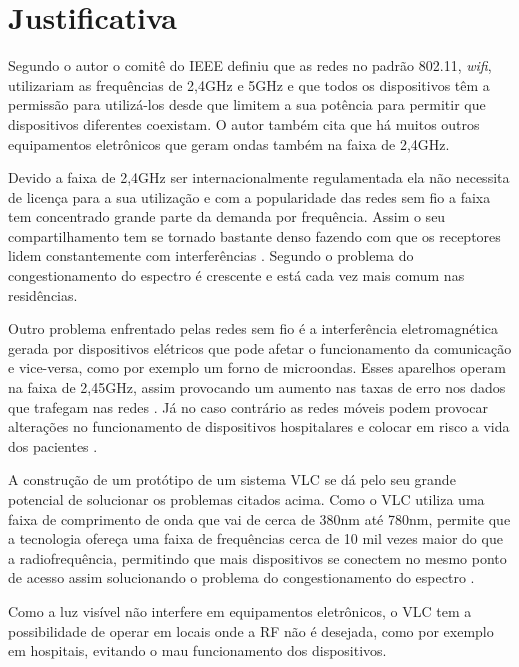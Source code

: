 \section{Justificativa}

Segundo o autor  o comitê do IEEE definiu que as redes no padrão 802.11, \textit{wifi}, utilizariam as frequências de 2,4GHz e 5GHz e que todos os dispositivos têm a permissão para utilizá-los desde que limitem a sua potência para permitir que dispositivos diferentes coexistam. O autor  também cita que há muitos outros equipamentos eletrônicos que geram ondas também na faixa de 2,4GHz. 

Devido a faixa de 2,4GHz ser internacionalmente regulamentada ela não necessita de licença para a sua utilização e com a popularidade das redes sem fio a faixa tem concentrado grande parte da demanda por frequência. Assim o seu compartilhamento tem se tornado bastante denso fazendo com que os receptores lidem constantemente com interferências \cite{barros}. Segundo  o problema do congestionamento do espectro é crescente e está cada vez mais comum nas residências.

Outro problema enfrentado pelas redes sem fio é a interferência eletromagnética gerada por dispositivos elétricos que pode afetar o funcionamento da comunicação e vice-versa, como por exemplo um forno de microondas. Esses aparelhos operam na faixa de 2,45GHz, assim provocando um aumento nas taxas de erro nos dados que trafegam nas redes \cite{barros}. Já no caso contrário as redes móveis podem provocar alterações no funcionamento de dispositivos hospitalares e colocar em risco a vida dos pacientes \cite{cabral}.

A construção de um protótipo de um sistema VLC se dá pelo seu grande potencial de solucionar os problemas citados acima. Como o VLC utiliza uma faixa de comprimento de onda que vai de cerca de 380nm até 780nm, permite que a tecnologia ofereça uma faixa de frequências cerca de 10 mil vezes maior do que a radiofrequência, permitindo que mais dispositivos se conectem no mesmo ponto de acesso assim solucionando o problema do congestionamento do espectro \cite{conceiccao2015comunicaccao}. 

Como a luz visível não interfere em equipamentos eletrônicos, o VLC tem a possibilidade de operar  em locais onde a RF não é desejada, como por exemplo em hospitais, evitando o mau funcionamento dos dispositivos.

